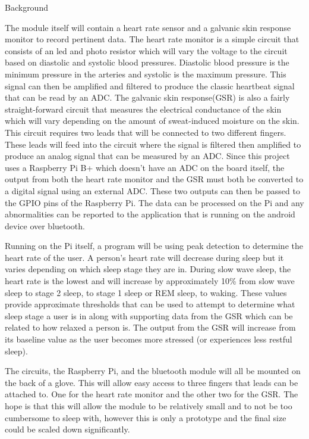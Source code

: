 \documentclass[finalProposal.tex]{subfiles}
\begin{document}
{\Large Background}

The module itself will contain a heart rate sensor and a galvanic skin response monitor to record pertinent data. The heart rate monitor is a simple circuit that consists of an led and photo resistor
which will vary the voltage to the circuit based on diastolic and systolic blood pressures. Diastolic blood pressure is the minimum pressure in the arteries and systolic is the maximum pressure. This
signal can then be amplified and filtered to produce the classic heartbeat signal that can be read by an ADC. The galvanic skin response(GSR) is also a fairly straight-forward circuit that measures
the electrical conductance of the skin which will vary depending on the amount of sweat-induced moisture on the skin. This circuit requires two leads that will be connected to two different fingers.
These leads will feed into the circuit where the signal is filtered then amplified to produce an analog signal that can be measured by an ADC. Since this project uses a Raspberry Pi B+ which doesn't have
an ADC on the board itself, the output from both the heart rate monitor and the GSR must both be converted to a digital signal using an external ADC. These two outputs can then be passed to the GPIO
pins of the Raspberry Pi. The data can be processed on the Pi and any abnormalities can be reported to the application that is running on the android device over bluetooth.  

Running on the Pi itself, a program will be using peak detection to determine the heart rate of the user. A person's heart rate will decrease during sleep but it varies depending on which sleep stage
they are in. During slow wave sleep, the heart rate is the lowest and will increase by approximately 10\% from slow wave sleep to stage 2 sleep, to stage 1 sleep or REM sleep, to waking. These values
provide approximate thresholds that can be used to attempt to determine what sleep stage a user is in along with supporting data from the GSR which can be related to how relaxed a person is. The output
from the GSR will increase from its baseline value as the user becomes more stressed (or experiences less restful sleep).

The circuits, the Raspberry Pi, and the bluetooth module will all be mounted on the back of a glove. This will allow easy access to three fingers that leads can be attached to. One for the heart rate
monitor and the other two for the GSR. The hope is that this will allow the module to be relatively small and to not be too cumbersome to sleep with, however this is only a prototype and the final
size could be scaled down significantly.
\end{document}
